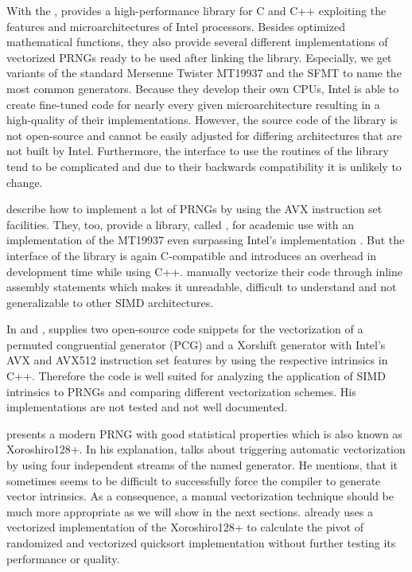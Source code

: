 \documentclass{stdlocal}
\begin{document}
  With the , \citeauthor{intel-mkl} provides a high-performance library for C and C++ exploiting the features and microarchitectures of Intel processors.
  Besides optimized mathematical functions, they also provide several different implementations of vectorized PRNGs ready to be used after linking the library.
  Especially, we get variants of the standard Mersenne Twister MT19937 and the SFMT to name the most common generators.
  Because they develop their own CPUs, Intel is able to create fine-tuned code for nearly every given microarchitecture resulting in a high-quality of their implementations.
  However, the source code of the library is not open-source and cannot be easily adjusted for differing architectures that are not built by Intel.
  Furthermore, the interface to use the routines of the library tend to be complicated and due to their backwards compatibility it is unlikely to change.
  \autocite{intel-mkl}

  \textcite{barash2017} describe how to implement a lot of PRNGs by using the AVX instruction set facilities.
  They, too, provide a library, called , for academic use with an implementation of the MT19937 even surpassing Intel's implementation \autocite{guskova2016}.
  But the interface of the library is again C-compatible and introduces an overhead in development time while using C++.
  \citeauthor{barash2017} manually vectorize their code through inline assembly statements which makes it unreadable, difficult to understand and not generalizable to other SIMD architectures.

  In \textcite{lemire-pcg} and \textcite{lemire-xorshift}, \citeauthor{lemire-pcg} supplies two open-source code snippets for the vectorization of a permuted congruential generator (PCG) and a Xorshift generator with Intel's AVX and AVX512 instruction set features by using the respective intrinsics in C++.
  Therefore the code is well suited for analyzing the application of SIMD intrinsics to PRNGs and comparing different vectorization schemes.
  His implementations are not tested and not well documented.

  \textcite{vigna-xoroshiro} presents a modern PRNG with good statistical properties which is also known as Xoroshiro128+.
  In his explanation, \citeauthor{vigna-xoroshiro} talks about triggering automatic vectorization by using four independent streams of the named generator.
  He mentions, that it sometimes seems to be difficult to successfully force the compiler to generate vector intrinsics.
  As a consequence, a manual vectorization technique should be much more appropriate as we will show in the next sections.
  \textcite{blacher2018} already uses a vectorized implementation of the Xoroshiro128+ to calculate the pivot of randomized and vectorized quicksort implementation without further testing its performance or quality.
\end{document}
